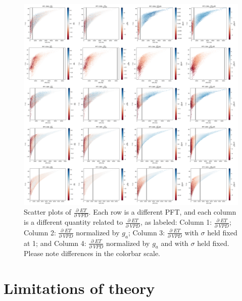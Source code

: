 \documentclass[draft,linenumbers]{agujournal}
\begin{document}
\begin{figure}[h]
\centering
\centerline{\includegraphics[width=1.4\textwidth]{./fig06.png}}
\caption{Scatter plots of $\frac{\partial \; ET}{\partial \; VPD}$. Each row is a different PFT, and each column is a different quantity related to $\frac{\partial \; ET}{\partial \; VPD}$, as labeled: Column 1: $\frac{\partial \; ET}{\partial \; VPD}$; Column 2: $\frac{\partial \; ET}{\partial \; VPD}$ normalized by $g_a$; Column 3: $\frac{\partial \; ET}{\partial \; VPD}$ with $\sigma$ held fixed at 1; and Column 4: $\frac{\partial \; ET}{\partial \; VPD}$ normalized by $g_a$ and with $\sigma$ held fixed. Please note differences in the colorbar scale.}
\label{real}
\end{figure}



\section{Limitations of theory}
\end{document}
